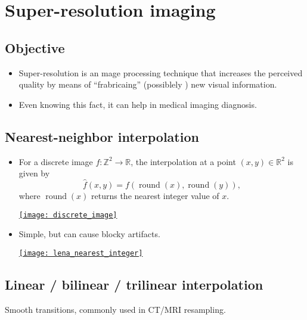 \chapter{Super-resolution imaging}

\section{Objective}
\begin{itemize}
\item Super-resolution is an mage processing technique that
  increases the perceived quality by means of ``frabricaing''
  (possiblely ) new visual information.
\item Even knowing this fact, it can help in medical imaging
  diagnosis.
\end{itemize}

\section{Nearest-neighbor interpolation}
\begin{itemize}
\item For a discrete image $f: \mathbb{Z}^2 \to \mathbb{R}$, the interpolation at a point 
$(x,y) \in \mathbb{R}^2$ is given by
\begin{equation}
\hat{f}(x,y) = f\!\left( \operatorname{round}(x), \operatorname{round}(y) \right),
\end{equation}
where $\operatorname{round}(x)$ returns the nearest integer value of $x$. 
\vspace{-2.5ex}
\begin{center}
  \href{https://www.mrecacademics.com/DepartmentStudyMaterials/20201220-Digital%20Image%20Processing%20Notes.pdf}{\texttt{[image: discrete\_image]}}
\end{center}
\item Simple, but can cause blocky artifacts.
\begin{center}
  \href{}{\texttt{[image: lena\_nearest\_integer]}}
\end{center}
\end{itemize}

\section{Linear / bilinear / trilinear interpolation}

Smooth transitions, commonly used in CT/MRI resampling.

